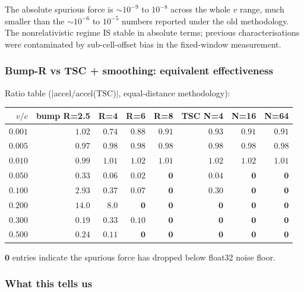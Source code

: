 \documentclass[11pt,a4paper]{article}
\begin{document}
The absolute spurious force is $\sim 10^{-9}$ to $10^{-8}$ across
the whole $v$ range, much smaller than the $\sim 10^{-6}$ to
$10^{-5}$ numbers reported under the old methodology.  The
nonrelativistic regime IS stable in absolute terms; previous
characterisations were contaminated by sub-cell-offset bias in
the fixed-window measurement.

\subsubsection*{Bump-R vs TSC + smoothing: equivalent effectiveness}

Ratio table ($|$accel$/$accel(TSC)$|$, equal-distance methodology):

\begin{center}
\begin{tabular}{rrrrrrrr}
\toprule
$v/c$ & bump R=2.5 & R=4 & R=6 & R=8 & TSC N=4 & N=16 & N=64 \\
\midrule
$0.001$ & $1.02$ & $0.74$ & $0.88$ & $0.91$ & $0.93$ & $0.91$ & $0.91$ \\
$0.005$ & $0.97$ & $0.98$ & $0.98$ & $0.98$ & $0.98$ & $0.98$ & $0.98$ \\
$0.010$ & $0.99$ & $1.01$ & $1.02$ & $1.01$ & $1.02$ & $1.02$ & $1.01$ \\
$0.050$ & $0.33$ & $0.06$ & $0.02$ & $\mathbf{0}$ & $0.04$ & $\mathbf{0}$ & $\mathbf{0}$ \\
$0.100$ & $2.93$ & $0.37$ & $0.07$ & $\mathbf{0}$ & $0.30$ & $\mathbf{0}$ & $\mathbf{0}$ \\
$0.200$ & $14.0$ & $8.0 $ & $\mathbf{0}$ & $\mathbf{0}$ & $\mathbf{0}$ & $\mathbf{0}$ & $\mathbf{0}$ \\
$0.300$ & $0.19$ & $0.33$ & $0.10$ & $\mathbf{0}$ & $\mathbf{0}$ & $\mathbf{0}$ & $\mathbf{0}$ \\
$0.500$ & $0.24$ & $0.11$ & $\mathbf{0}$ & $\mathbf{0}$ & $\mathbf{0}$ & $\mathbf{0}$ & $\mathbf{0}$ \\
\bottomrule
\end{tabular}
\end{center}

$\mathbf{0}$ entries indicate the spurious force has dropped below
float32 noise floor.

\subsubsection*{What this tells us}
\end{document}
